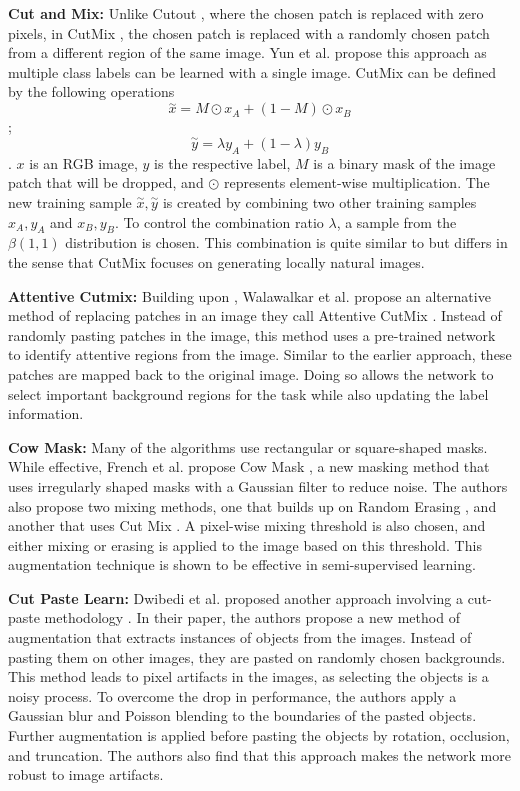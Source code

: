 \documentclass[a4paper,11pt,openright]{book}
\begin{document}
\textbf{Cut and Mix: }
Unlike Cutout \cite{devriesImprovedRegularizationConvolutional2017}, where the chosen patch is replaced with zero pixels, in CutMix \cite{yunCutMixRegularizationStrategy2019}, the chosen patch is replaced with a randomly chosen patch from a different region of the same image. Yun et al. propose this approach as multiple class labels can be learned with a single image.
CutMix can be defined by the following operations $$\overset{\sim}x = M \odot x_{A} + (1-M) \odot x_{B}$$ ; $$\overset{\sim}y = \lambda y_{A}+ (1- \lambda)y_{B}$$. $x$ is an RGB image, $y$ is the respective label, $M$ is a binary mask of the image patch that will be dropped, and $\odot$ represents element-wise multiplication. The new training sample $\overset{\sim}x , \overset{\sim}y$ is created by combining two other training samples $x_{A}, y_{A}$ and $x_{B} , y_{B}$. To control the combination ratio $\lambda$, a sample from the $\beta(1,1)$ distribution is chosen. This combination is quite similar to \cite{zhangMixupEmpiricalRisk2018} but differs in the sense that CutMix focuses on generating locally natural images.

\textbf{Attentive Cutmix: }
Building upon \cite{yunCutMixRegularizationStrategy2019}, Walawalkar et al. propose an alternative method of replacing patches in an image they call Attentive CutMix \cite{walawalkarAttentiveCutMixEnhanced2020}. Instead of randomly pasting patches in the image, this method uses a pre-trained network to identify attentive regions from the image. Similar to the earlier approach, these patches are mapped back to the original image. Doing so allows the network to select important background regions for the task while also updating the label information.

\textbf{Cow Mask: }
Many of the algorithms use rectangular or square-shaped masks. While effective, French et al. propose Cow Mask \cite{frenchMilkingCowMaskSemiSupervised2020}, a new masking method that uses irregularly shaped masks with a Gaussian filter to reduce noise. The authors also propose two mixing methods, one that builds up on Random Erasing \cite{zhongRandomErasingData2020}, and another that uses Cut Mix \cite{yunCutMixRegularizationStrategy2019}. A pixel-wise mixing threshold is also chosen, and either mixing or erasing is applied to the image based on this threshold. This augmentation technique is shown to be effective in semi-supervised learning.

\textbf{Cut Paste Learn: }
Dwibedi et al. proposed another approach involving a cut-paste methodology \cite{dwibediCutPasteLearn2017}. In their paper, the authors propose a new method of augmentation that extracts instances of objects from the images. Instead of pasting them on other images, they are pasted on randomly chosen backgrounds. This method leads to pixel artifacts in the images, as selecting the objects is a noisy process. To overcome the drop in performance, the authors apply a Gaussian blur and Poisson blending to the boundaries of the pasted objects. Further augmentation is applied before pasting the objects by rotation, occlusion, and truncation. The authors also find that this approach makes the network more robust to image artifacts.
\end{document}
